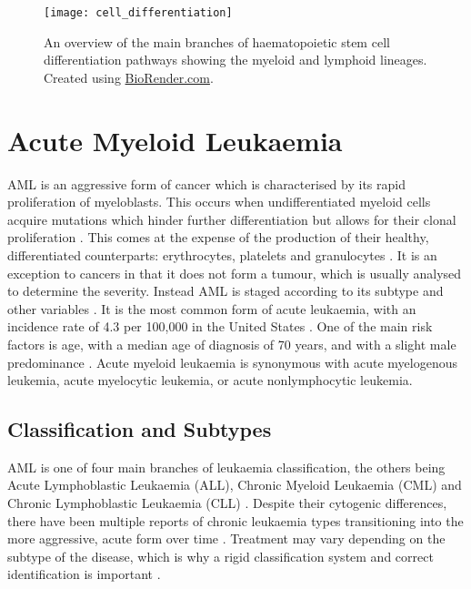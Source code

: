 \begin{figure}[!ht]
    \centering
    \texttt{[image: cell\_differentiation]}
    \caption[Stem cell differentiation]{An overview of the main branches of haematopoietic stem cell differentiation pathways showing the myeloid and lymphoid lineages. Created using \href{https://biorender.com/}{BioRender.com}. } 
    \label{fig:cell_differentiation}
\end{figure}


\section{Acute Myeloid Leukaemia}

\ac{AML} is an aggressive form of cancer which is characterised by its rapid proliferation of myeloblasts. This occurs when undifferentiated myeloid cells acquire mutations which hinder further differentiation but allows for their clonal proliferation \citep{Khwaja2016}. This comes at the expense of the production of their healthy, differentiated counterparts: erythrocytes, platelets and granulocytes \citep{Khwaja2016}. It is an exception to cancers in that it does not form a tumour, which is usually analysed to determine the severity. Instead \ac{AML} is staged according to its subtype and other variables \citep{ACS2018}. It is the most common form of acute leukaemia, with an incidence rate of 4.3 per 100,000 in the United States \citep{Kouchkovsky2016}. One of the main risk factors is age, with a median age of diagnosis of 70 years, and with a slight male predominance \citep{juliusson2009age, Khwaja2016}. Acute myeloid leukaemia is synonymous with acute myelogenous leukemia, acute myelocytic leukemia, or acute nonlymphocytic leukemia.


\subsection{Classification and Subtypes}
\label{Classification and Subtypes}
\ac{AML} is one of four main branches of leukaemia classification, the others being Acute Lymphoblastic Leukaemia (ALL), Chronic Myeloid Leukaemia (CML) and Chronic Lymphoblastic Leukaemia (CLL) \citep{leukaemiabook}. Despite their cytogenic differences, there have been multiple reports of chronic leukaemia types transitioning into the more aggressive, acute form over time \citep{kaur2016rapid, frenkel1981acute, jacobs1984acute}. Treatment may vary depending on the subtype of the disease, which is why a rigid classification system and correct identification is important \citep{leukaemiabook}.

